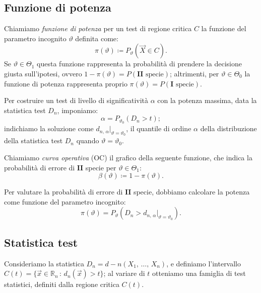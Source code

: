         \subsection{Funzione di potenza}
            \begin{defn}\label{defn:Funzione_potenza}
                Chiamiamo \emph{funzione di potenza} per un test di regione critica $C$ la funzione del 
                parametro incognito $\vartheta$ definita come: \[
                    \pi(\vartheta) \coloneqq P_\vartheta(\vec{X} \in C)
                .\] Se $\vartheta \in \Theta_1$ questa funzione rappresenta la probabilità di prendere la 
                decisione giusta sull'ipotesi, ovvero $1 - \pi(\vartheta)=P(\mathbf{II}\text{ specie})$; altrimenti, 
                per $\vartheta \in \Theta_0$ la funzione di potenza rappresenta proprio 
                $\pi(\vartheta)=P(\mathbf{I}\text{ specie})$.
            \end{defn}
            \begin{obsv}
                Per costruire un test di livello di significatività $\alpha$ con la potenza massima, data la 
                statistica test $D_n$, imponiamo: \[
                    \alpha = P_{\vartheta_0}(D_n > t)
                ;\] indichiamo la soluzione come $d_{n,\,\alpha}|_{\vartheta=\vartheta_0}$, il quantile di 
                ordine $\alpha$ della distribuzione della statistica test $D_n$ quando $\vartheta=\vartheta_0$.
            \end{obsv}
            \begin{defn}
                Chiamiamo \emph{curva operativa} (OC) il grafico della seguente funzione, che indica la 
                probabilità di errore di $\mathbf{II}$ specie per $\vartheta \in \Theta_1$: \[
                    \beta(\vartheta) \coloneqq 1 - \pi(\vartheta)
                .\] 
            \end{defn}
            \begin{obsv}
                Per valutare la probabilità di errore di $\mathbf{II}$ specie, dobbiamo calcolare la potenza 
                come funzione del parametro incognito: \[
                    \pi(\vartheta) = P_\vartheta(D_n > d_{n,\,\alpha}|_{\vartheta=\vartheta_0})
                .\]
            \end{obsv}
        \subsection{Statistica test}
            Consideriamo la statistica $D_n = d-n(X_1,\, \ldots,\, X_{n})$, e definiamo l'intervallo 
            $C(t) = \{\vec{x} \in \mathbb{R}_n \,:\, d_n(\vec{x}) > t\}$; al variare di $t$ otteniamo una famiglia 
            di test statistici, definiti dalla regione critica $C(t)$.

